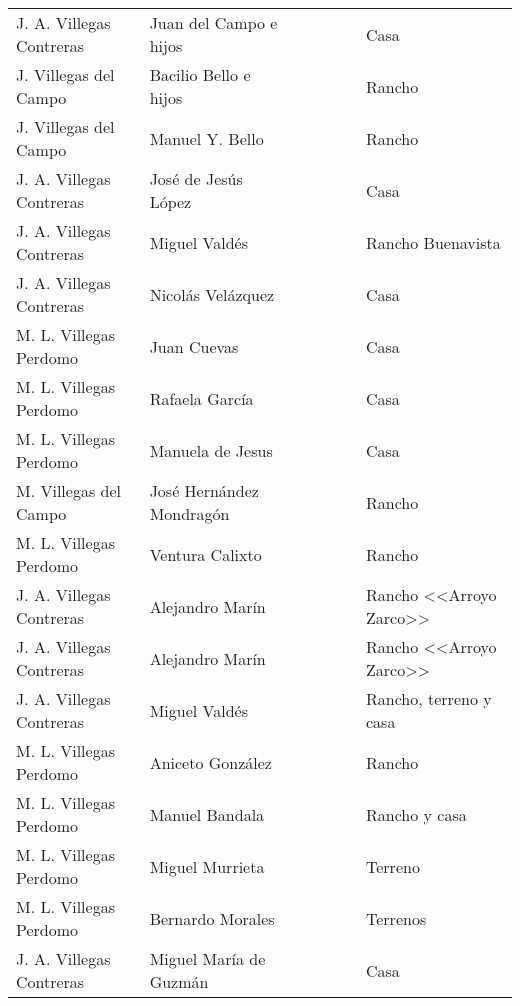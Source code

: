 \documentclass[14pt,twoside,final]{extbook} %
\begin{document}
{\begin{longtable}[c]{@{}p{2.5cm}lrSrrl@{}}
J. A. Villegas Contreras & Juan del Campo e hijos &  &  &  &  & Casa \\
J. Villegas del Campo & Bacilio Bello e hijos &  &  & {} & {} & Rancho \\
J. Villegas del Campo & Manuel Y. Bello &  & {} & {} & {} & Rancho \\
J. A. Villegas Contreras & José de Jesús López &  & {} & {} & {} & Casa \\
J. A. Villegas Contreras & Miguel Valdés &  &  &  &  & Rancho Buenavista \\
J. A. Villegas Contreras & Nicolás Velázquez &  &  &  &  & Casa \\
M. L. Villegas Perdomo & Juan Cuevas &  & {} & {} & {} & Casa \\
M. L. Villegas Perdomo & Rafaela García &  & {} & {} & {} & Casa \\
M. L. Villegas Perdomo & Manuela de Jesus &  & {} & {} & {} & Casa \\
M. Villegas del Campo & José Hernández Mondragón &  & {} & {} & {} & Rancho \\
M. L. Villegas Perdomo & Ventura Calixto &  & {} & {} & {} & Rancho \\
J. A. Villegas Contreras & Alejandro Marín &  & {} &  &  & Rancho <<Arroyo Zarco>> \\
J. A. Villegas Contreras & Alejandro Marín &  &  &  &  & Rancho <<Arroyo Zarco>> \\
J. A. Villegas Contreras & Miguel Valdés &  & {} &  &  & Rancho, terreno y casa \\
M. L. Villegas Perdomo & Aniceto González &  &  & {} & {} & Rancho \\
M. L. Villegas Perdomo & Manuel Bandala &  & {} & {} & {} & Rancho y casa \\
M. L. Villegas Perdomo & Miguel Murrieta &  & {} & {} & {} & Terreno \\
M. L. Villegas Perdomo & Bernardo Morales &  & {} & {} & {} & Terrenos \\
J. A. Villegas Contreras & Miguel María de Guzmán &  &  &  &  & Casa \\

\end{longtable}}
\end{document}
